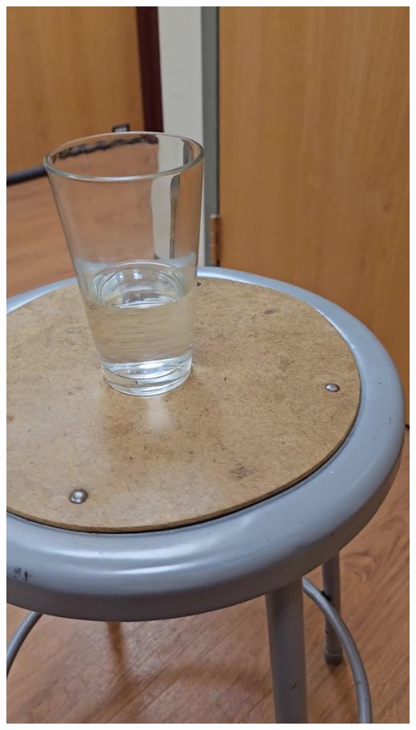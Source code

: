 \documentclass{article}
\begin{document}
\begin{center}
    \includegraphics[scale=0.02]{images/water1.jpg}

\end{center}
\end{document}

